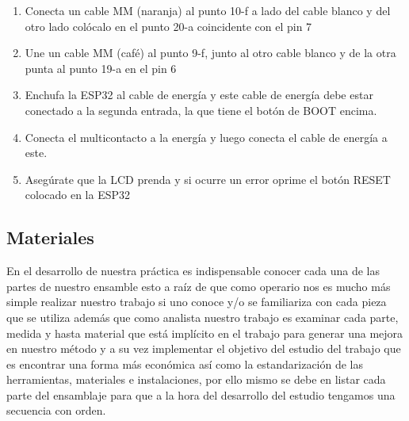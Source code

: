\begin{enumerate}
    \item  Conecta un cable MM (naranja) al punto 10-f a lado del cable blanco y del otro lado colócalo en el punto 20-a coincidente con el pin 7

    \item Une un cable MM (café) al punto 9-f, junto al otro cable blanco y de la otra punta al punto 19-a en el pin 6 

    \item  Enchufa la ESP32 al cable de energía y este cable de energía debe estar conectado a la segunda entrada, la que tiene el botón de BOOT encima.

    \item Conecta el multicontacto a la energía y luego conecta el cable de energía a este.


    \item Asegúrate que la LCD prenda y si ocurre un error oprime el botón RESET colocado en la ESP32

\end{enumerate}






% 




\newpage
\subsection{Materiales}

En el desarrollo de nuestra práctica es indispensable conocer cada una de las partes de nuestro ensamble esto a raíz de que como operario nos es mucho más simple realizar nuestro trabajo si uno conoce y/o se familiariza con cada pieza que se utiliza además que como analista nuestro trabajo es examinar cada parte, medida y hasta material que está implícito en el trabajo para generar una mejora en nuestro método y a su vez implementar el objetivo del estudio del trabajo que es encontrar una forma más económica así como la estandarización de las herramientas, materiales e instalaciones, por ello mismo se debe en listar cada parte del ensamblaje para que a la hora del desarrollo del estudio tengamos una secuencia con orden.

